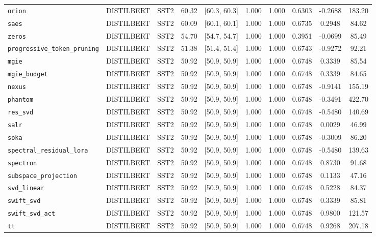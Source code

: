 \begin{table}[t]
\begin{tabular}{l l l c c c c c c c}
\texttt{orion} & DISTILBERT & SST2 & 60.32 & [60.3, 60.3] & 1.000 & 1.000 & 0.6303 & -0.2688 & 183.20 \\
\texttt{saes} & DISTILBERT & SST2 & 60.09 & [60.1, 60.1] & 1.000 & 1.000 & 0.6735 & 0.2948 & 84.62 \\
\texttt{zeros} & DISTILBERT & SST2 & 54.70 & [54.7, 54.7] & 1.000 & 1.000 & 0.3951 & -0.0699 & 85.49 \\
\texttt{progressive\_token\_pruning} & DISTILBERT & SST2 & 51.38 & [51.4, 51.4] & 1.000 & 1.000 & 0.6743 & -0.9272 & 92.21 \\
\texttt{mgie} & DISTILBERT & SST2 & 50.92 & [50.9, 50.9] & 1.000 & 1.000 & 0.6748 & 0.3339 & 85.54 \\
\texttt{mgie\_budget} & DISTILBERT & SST2 & 50.92 & [50.9, 50.9] & 1.000 & 1.000 & 0.6748 & 0.3339 & 84.65 \\
\texttt{nexus} & DISTILBERT & SST2 & 50.92 & [50.9, 50.9] & 1.000 & 1.000 & 0.6748 & -0.9141 & 155.19 \\
\texttt{phantom} & DISTILBERT & SST2 & 50.92 & [50.9, 50.9] & 1.000 & 1.000 & 0.6748 & -0.3491 & 422.70 \\
\texttt{res\_svd} & DISTILBERT & SST2 & 50.92 & [50.9, 50.9] & 1.000 & 1.000 & 0.6748 & -0.5480 & 140.69 \\
\texttt{salr} & DISTILBERT & SST2 & 50.92 & [50.9, 50.9] & 1.000 & 1.000 & 0.6748 & 0.0029 & 46.99 \\
\texttt{soka} & DISTILBERT & SST2 & 50.92 & [50.9, 50.9] & 1.000 & 1.000 & 0.6748 & -0.3009 & 86.20 \\
\texttt{spectral\_residual\_lora} & DISTILBERT & SST2 & 50.92 & [50.9, 50.9] & 1.000 & 1.000 & 0.6748 & -0.5480 & 139.63 \\
\texttt{spectron} & DISTILBERT & SST2 & 50.92 & [50.9, 50.9] & 1.000 & 1.000 & 0.6748 & 0.8730 & 91.68 \\
\texttt{subspace\_projection} & DISTILBERT & SST2 & 50.92 & [50.9, 50.9] & 1.000 & 1.000 & 0.6748 & 0.1133 & 47.16 \\
\texttt{svd\_linear} & DISTILBERT & SST2 & 50.92 & [50.9, 50.9] & 1.000 & 1.000 & 0.6748 & 0.5228 & 84.37 \\
\texttt{swift\_svd} & DISTILBERT & SST2 & 50.92 & [50.9, 50.9] & 1.000 & 1.000 & 0.6748 & 0.3339 & 85.81 \\
\texttt{swift\_svd\_act} & DISTILBERT & SST2 & 50.92 & [50.9, 50.9] & 1.000 & 1.000 & 0.6748 & 0.9800 & 121.57 \\
\texttt{tt} & DISTILBERT & SST2 & 50.92 & [50.9, 50.9] & 1.000 & 1.000 & 0.6748 & 0.9268 & 207.18 \\

\end{tabular}
\end{table}
